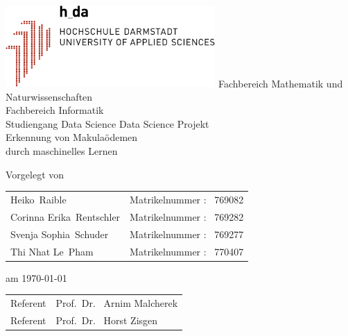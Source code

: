 \documentclass[10pt]{report}
\begin{document}

\begin{titlepage}
\begin{center}\  

\vfill
\includegraphics[width=0.6\textwidth]{./pic/Logo_h_da}
\vfill
Fachbereich Mathematik und Naturwissenschaften\\
Fachbereich Informatik\\
Studiengang Data Science
\vfill
{\LARGE Data Science Projekt} \\[0.5cm]
\vfill
{\Huge Erkennung von Makulaödemen \\
durch maschinelles Lernen}
\vfill

Vorgelegt von  

\begin{tabular}{ll}
Heiko\ Raible & Matrikelnummer : \ 769082 \\
Corinna Erika\ Rentschler  & Matrikelnummer : \ 769282 \\
Svenja Sophia\ Schuder & Matrikelnummer : \ 769277 \\
Thi Nhat Le\ Pham  & Matrikelnummer : \ 770407 \\
\end{tabular}

am  \today

\vfill
\begin{tabular}{ll}
Referent     & Prof.\ Dr. \ Arnim Malcherek \\
Referent   & Prof.\ Dr. \ Horst Zisgen
\end{tabular}
\vfill
\end{center}
\end{titlepage}
\end{document}
